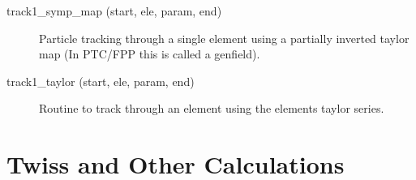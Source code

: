 \begin{description}
\label{r:track1.symp.map}
\item[track1_symp_map (start, ele, param, end)] \Newline
Particle tracking through a single element using a partially inverted 
taylor map (In PTC/FPP this is called a genfield). 

\label{r:track1.taylor}
\item[track1_taylor (start, ele, param, end)] \Newline
Routine to track through an element using the elements taylor series. 

\end{description}

\section{Twiss and Other Calculations}
\label{r:twiss}

